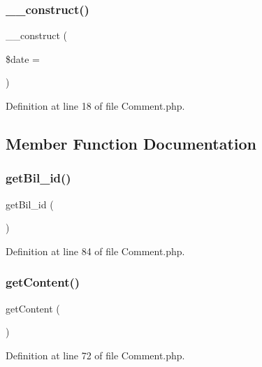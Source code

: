 \subsubsection{\+\_\+\+\_\+construct()}
{\footnotesize\ttfamily \+\_\+\+\_\+construct (\begin{DoxyParamCaption}\item[{}]{\$date = {\ttfamily []} }\end{DoxyParamCaption})}



Definition at line 18 of file Comment.\+php.



\subsection{Member Function Documentation}
\mbox{\label{class_src_1_1_entity_1_1_comment_a1df6ee009c81d0d807d36d18d40b9e97}} 
\subsubsection{get\+Bil\+\_\+id()}
{\footnotesize\ttfamily get\+Bil\+\_\+id (\begin{DoxyParamCaption}{ }\end{DoxyParamCaption})}



Definition at line 84 of file Comment.\+php.

\mbox{\label{class_src_1_1_entity_1_1_comment_a58e43f09a06ce4e29b192c4e17ce7915}} 
\subsubsection{get\+Content()}
{\footnotesize\ttfamily get\+Content (\begin{DoxyParamCaption}{ }\end{DoxyParamCaption})}



Definition at line 72 of file Comment.\+php.

\mbox{\label{class_src_1_1_entity_1_1_comment_ae5e6c0bedcef3f514100c20ee92c901a}} 
